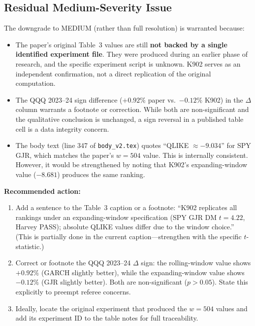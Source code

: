 \documentclass[12pt,a4paper]{article}
\begin{document}
\subsection*{Residual Medium-Severity Issue}

The downgrade to MEDIUM (rather than full resolution) is warranted because:
\begin{itemize}[nosep]
\item The paper's original Table~3 values are still \textbf{not backed by a single identified experiment file}. They were produced during an earlier phase of research, and the specific experiment script is unknown. K902 serves as an independent confirmation, not a direct replication of the original computation.
\item The QQQ 2023--24 sign difference ($+0.92\%$ paper vs.\ $-0.12\%$ K902) in the $\Delta$ column warrants a footnote or correction. While both are non-significant and the qualitative conclusion is unchanged, a sign reversal in a published table cell is a data integrity concern.
\item The body text (line 347 of \texttt{body\_v2.tex}) quotes ``QLIKE $\approx -9.034$'' for SPY GJR, which matches the paper's $w = 504$ value. This is internally consistent. However, it would be strengthened by noting that K902's expanding-window value ($-8.681$) produces the same ranking.
\end{itemize}

\textbf{Recommended action:}
\begin{enumerate}[nosep]
\item Add a sentence to the Table~3 caption or a footnote: ``K902 replicates all rankings under an expanding-window specification (SPY GJR DM $t = 4.22$, Harvey PASS); absolute QLIKE values differ due to the window choice.'' (This is partially done in the current caption---strengthen with the specific $t$-statistic.)
\item Correct or footnote the QQQ 2023--24 $\Delta$ sign: the rolling-window value shows $+0.92\%$ (GARCH slightly better), while the expanding-window value shows $-0.12\%$ (GJR slightly better). Both are non-significant ($p > 0.05$). State this explicitly to preempt referee concerns.
\item Ideally, locate the original experiment that produced the $w = 504$ values and add its experiment ID to the table notes for full traceability.
\end{enumerate}


\bigskip
\end{document}
